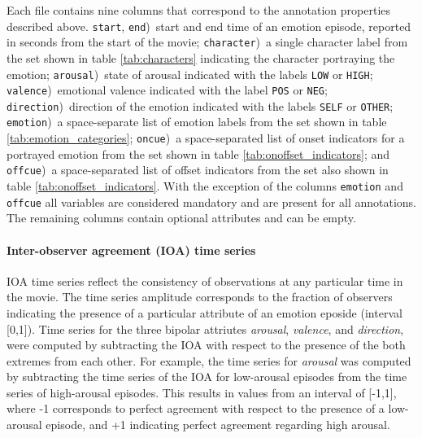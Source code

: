 \documentclass[10pt,a4paper,twocolumn]{article}
\begin{document}
Each file contains nine columns that correspond to the annotation properties
described above. \texttt{start}, \texttt{end})~start and end time of an emotion
episode, reported in seconds from the start of the movie; \texttt{character})~a
single character label from the set shown in table \ref{tab:characters}
indicating the character portraying the emotion; \texttt{arousal})~state of
arousal indicated with the labels \texttt{LOW} or \texttt{HIGH};
\texttt{valence})~emotional valence indicated with the label \texttt{POS} or
\texttt{NEG}; \texttt{direction})~direction of the emotion indicated with the
labels \texttt{SELF} or \texttt{OTHER}; \texttt{emotion})~a space-separate list
of emotion labels from the set shown in table \ref{tab:emotion_categories};
\texttt{oncue})~a space-separated list of onset indicators for a portrayed
emotion from the set shown in table \ref{tab:onoffset_indicators}; and
\texttt{offcue})~a space-separated list of offset indicators from the set also
shown in table \ref{tab:onoffset_indicators}.  With the exception of the
columns \texttt{emotion} and \texttt{offcue} all variables are considered
mandatory and are present for all annotations. The remaining columns contain
optional attributes and can be empty.

\paragraph{Inter-observer agreement (IOA) time series} IOA time series reflect
the consistency of observations at any particular time in the movie. The time
series amplitude corresponds to the fraction of observers indicating the
presence of a particular attribute of an emotion eposide (interval [0,1]). Time
series for the three bipolar attriutes \textit{arousal}, \textit{valence}, and
\textit{direction}, were computed by subtracting the IOA with respect to the
presence of the both extremes from each other.  For example, the time series
for \textit{arousal} was computed by subtracting the time series of the IOA for
low-arousal episodes from the time series of high-arousal episodes. This
results in values from an interval of [-1,1], where -1 corresponds to perfect
agreement with respect to the presence of a low-arousal episode, and +1
indicating perfect agreement regarding high arousal.
\end{document}
